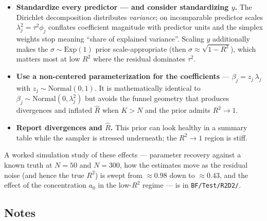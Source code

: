 \documentclass[
  letterpaper,
  DIV=11,
  numbers=noendperiod]{scrartcl}
\begin{document}
\begin{tcolorbox}
\begin{itemize}
  \emph{concentrated} in that band (\(\text{Beta}(2, 6)\) or
  \(\text{Beta}(1, 3)\), prior mean \(\approx 0.25\)) is more honest, or
  fit \((a, b)\) to the \(R^2\) values reported in comparable studies
  (empirical Bayes).
\item
  \textbf{Standardize every predictor --- and consider standardizing
  \(y\).} The Dirichlet decomposition distributes \emph{variance}; on
  incomparable predictor scales \(\lambda_j^2 = \tau^2\phi_j\) conflates
  coefficient magnitude with predictor units and the simplex weights
  stop meaning ``share of explained variance''. Scaling \(y\)
  additionally makes the \(\sigma \sim \text{Exp}(1)\) prior
  scale-appropriate (then \(\sigma \approx \sqrt{1 - R^2}\)), which
  matters most at low \(R^2\) where the residual dominates \(\tau^2\).
\item
  \textbf{Use a non-centered parameterization for the coefficients} ---
  \(\beta_j = z_j\,\lambda_j\) with \(z_j \sim \text{Normal}(0, 1)\). It
  is mathematically identical to
  \(\beta_j \sim \text{Normal}(0, \lambda_j^2)\) but avoids the funnel
  geometry that produces divergences and inflated \(\hat R\) when
  \(K > N\) and the prior admits \(R^2 \to 1\).
\item
  \textbf{Report divergences and \(\hat R\).} This prior can look
  healthy in a summary table while the sampler is stressed underneath;
  the \(R^2 \to 1\) region is stiff.
\end{itemize}

\end{tcolorbox}

A worked simulation study of these effects --- parameter recovery
against a known truth at \(N = 50\) and \(N = 300\), how the estimates
move as the residual noise (and hence the true \(R^2\)) is swept from
\(\approx 0.98\) down to \(\approx 0.43\), and the effect of the
concentration \(a_0\) in the low-\(R^2\) regime --- is in
\texttt{BF/Test/R2D2/}.

\subsection{Notes}\label{notes}
\end{document}
